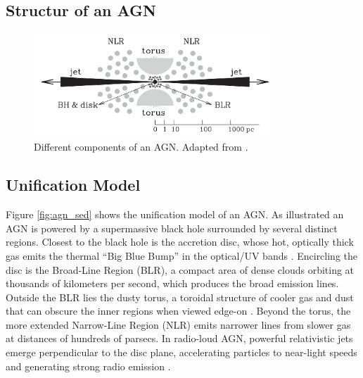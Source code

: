 \subsection{Structur of an AGN}

\begin{figure}[!ht]
	\centering
	\includegraphics[width=0.8\textwidth]{pictures/Chapter2/AGN_standard_paradigm.png}
	\caption{Different components of an AGN. Adapted from \textcite{mo2010galaxy}.}
	\label{fig:agn_structure_mo}
\end{figure}


\subsection{Unification Model}
Figure \ref{fig:agn_sed} shows the unification model of an AGN. 
As illustrated an AGN is powered by a supermassive black hole surrounded by several distinct regions. Closest to the black hole is the accretion disc, whose hot, optically thick gas emits the thermal “Big Blue Bump” in the optical/UV bands \parencite{peterson1997introduction}. Encircling the disc is the Broad-Line Region (BLR), a compact area of dense clouds orbiting at thousands of kilometers per second, which produces the broad emission lines. Outside the BLR lies the dusty torus, a toroidal structure of cooler gas and dust that can obscure the inner regions when viewed edge-on \parencite{antonucci1993unified}. Beyond the torus, the more extended Narrow-Line Region (NLR) emits narrower lines from slower gas at distances of hundreds of parsecs. In radio-loud AGN, powerful relativistic jets emerge perpendicular to the disc plane, accelerating particles to near-light speeds and generating strong radio emission \parencite{urry1995unified}.


